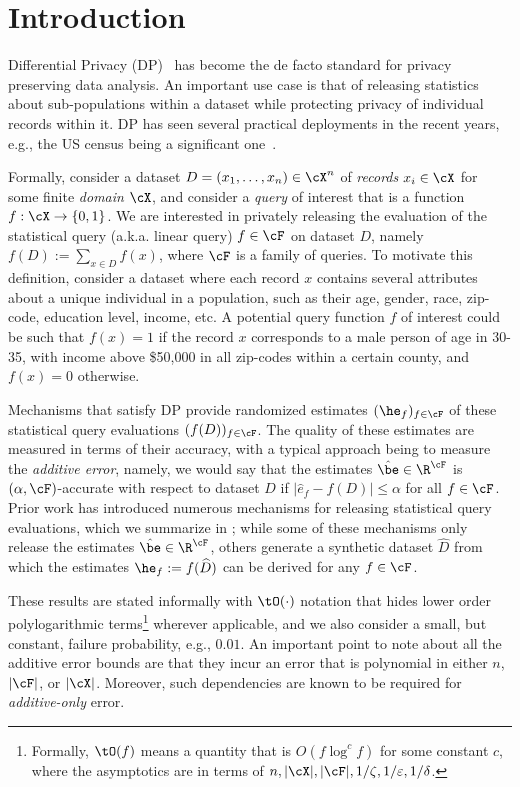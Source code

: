 \section{Introduction}\label{sec:intro}
Differential Privacy (DP)~\citep{Dwork:2006} has become the de facto standard for privacy preserving data analysis. An important use case is that of releasing statistics about sub-populations within a dataset while protecting privacy of individual records within it. DP has seen several practical deployments in the recent years, e.g., the US census being a significant one~\citep{abowd22topdown}.

Formally, consider a dataset $D = (x_1, \ldots, x_n) \in \cX^n$ of \emph{records} $x_i \in \cX$ for some finite \emph{domain} $\cX$, and consider a \emph{query} of interest that is a function $f : \cX \to \{0, 1\}$. We are interested in privately releasing the evaluation of the statistical query (a.k.a. linear query) $f \in \cF$ on dataset $D$, namely $f(D) := \sum_{x \in D} f(x)$, where $\cF$ is a family of queries. To motivate this definition, consider a dataset where each record $x$ contains several attributes about a unique individual in a population, such as their age, gender, race, zip-code, education level, income, etc. A potential query function $f$ of interest could be such that $f(x) = 1$ if the record $x$ corresponds to a male person of age in 30-35, with income above \$50,000 in all zip-codes within a certain county, and $f(x)=0$ otherwise.

Mechanisms that satisfy DP provide randomized estimates $(\he_f)_{f \in \cF}$ of these statistical query evaluations $(f(D))_{f \in \cF}$. The quality of these estimates are measured in terms of their accuracy, with a typical approach being to measure the {\em additive error}, namely, we would say that the estimates $\hat{\be} \in \R^{\cF}$ is $(\alpha, \cF)$-accurate with respect to dataset $D$ if $|\hat e_f - f(D)| \le \alpha$ for all $f \in \cF$. Prior work has introduced numerous mechanisms for releasing statistical query evaluations, which we summarize in ; while some of these mechanisms only release the estimates $\hat{\be} \in \R^{\cF}$, others generate a synthetic dataset $\widehat{D}$ from which the estimates $\he_f := f(\widehat{D})$ can be derived for any $f \in \cF$.

These results are stated informally with $\tO(\cdot)$ notation that hides lower order polylogarithmic terms\footnote{Formally, $\tO(f)$ means a quantity that is $O(f \log^c f)$ for some constant $c$, where the asymptotics are in terms of $n, |\cX|, |\cF|, 1/\zeta, 1/\eps, 1/\delta$.} 
wherever applicable, and we also consider a small, but constant, failure probability, e.g., $0.01$. An important point to note about all the additive error bounds are that they incur an error that is polynomial in either $n$, $|\cF|$, or $|\cX|$. Moreover, such dependencies are known to be required for {\em additive-only} error.


